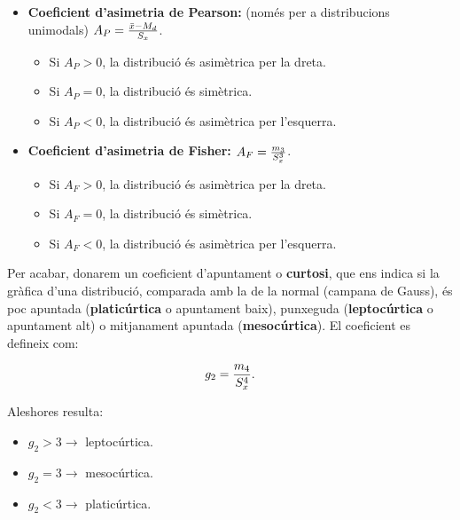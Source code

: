 \begin{itemize}

\item {\bf Coeficient d'asimetria de Pearson:} (nom\'es per a distribucions
unimodals)
 $ A_P = {\bar{x} - M_d \over
S_x}$.

\begin{itemize}

\item Si $A_P > 0$, la distribuci\'o \'es asim\`etrica per la dreta.

\item Si $A_P = 0$, la distribuci\'o \'es sim\`etrica.

\item Si $A_P < 0$, la distribuci\'o \'es asim\`etrica per l'esquerra.

\end{itemize}

\item {\bf Coeficient d'asimetria de Fisher:} 
 $A_F = {m_3 \over S_x^3}$.

\begin{itemize}

\item Si $A_F > 0$, la distribuci\'o \'es asim\`etrica per la dreta.

\item Si $A_F = 0$, la distribuci\'o \'es sim\`etrica.

\item Si $A_F < 0$, la distribuci\'o \'es asim\`etrica per l'esquerra.

\end{itemize}

\end{itemize}

Per acabar, donarem un coeficient d'apuntament o {\bf curtosi}, 
 que ens indica
si la gr\`afica d'una distribuci\'o, comparada amb la de la normal (campana de
Gauss), \'es poc apuntada ({\bf platic\'urtica}
 o apuntament baix), punxeguda
({\bf leptoc\'urtica} 
o apuntament alt) o mitjanament apuntada ({\bf mesoc\'urtica}). 
El coeficient es defineix com:

$$g_2 = {m_4 \over S_x^4}.$$

Aleshores resulta:
\begin{itemize}
\item $g_2 > 3 \to $ leptoc\'urtica.
\item $g_2 = 3 \to $ mesoc\'urtica.
\item $g_2 < 3 \to $ platic\'urtica.
\end{itemize}

